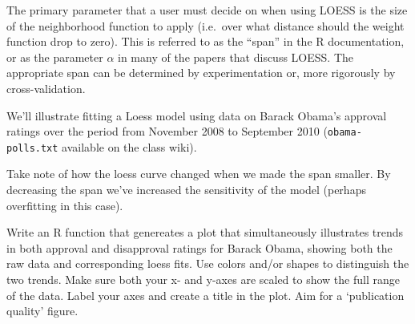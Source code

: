 The primary parameter that a user must decide on when using LOESS is the
size of the neighborhood function to apply (i.e.~over what distance
should the weight function drop to zero). This is referred to as the
``span'' in the R documentation, or as the parameter $\alpha$ in many of
the papers that discuss LOESS. The appropriate span can be determined by
experimentation or, more rigorously by cross-validation.

We'll illustrate fitting a Loess model using data on Barack Obama's
approval ratings over the period from November 2008 to September 2010
(\lstinline!obama-polls.txt! available on the class wiki).

Take note of how the loess curve changed when we made the span smaller.
By decreasing the span we've increased the sensitivity of the model
(perhaps overfitting in this case).

\medskip
\begin{assignment}
Write an R function that genereates a plot that
simultaneously illustrates trends in both approval and disapproval
ratings for Barack Obama, showing both the raw data and corresponding
loess fits. Use colors and/or shapes to distinguish the two trends. Make
sure both your x- and y-axes are scaled to show the full range of the
data. Label your axes and create a title in the plot. Aim for a
`publication quality' figure.
\end{assignment}


